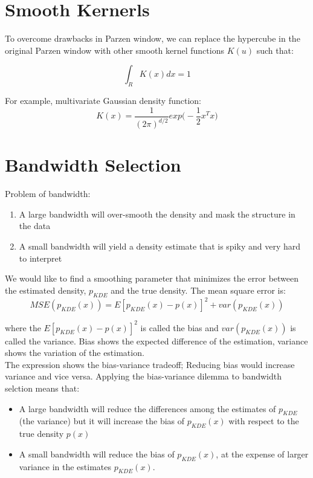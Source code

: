 \begin{multicols}{2}
\section{Smooth Kernerls}

\noindent To overcome drawbacks in Parzen window, we can replace the hypercube in the original Parzen window with other smooth kernel functions $K(u)$ such that:

$$\int_R K(x) dx = 1$$

\noindent For example, multivariate Gaussian density function:
$$K(x)=\frac{1}{(2 \pi)^{d/2}} exp \Big( - \frac{1}{2} x^T x\Big)$$

\section{Bandwidth Selection}

\noindent Problem of bandwidth:
\begin{enumerate}
    \item A large bandwidth will over-smooth the density and mask the structure in the data
    \item A small bandwidth will yield a density estimate that is spiky and very hard to interpret
\end{enumerate}

\noindent We would like to find a smoothing parameter that minimizes the error between the estimated density, $p_{KDE}$ and the true density. The mean square error is:
$$MSE(p_{KDE}(x)) = E[p_{KDE}(x) - p(x)]^2 + var(p_{KDE}(x))$$

\noindent where the $E[p_{KDE}(x) - p(x)]^2$ is called the bias and $var(p_{KDE}(x))$ is called the variance. Bias shows the expected difference of the estimation, variance shows the variation of the estimation. \\

\noindent The expression shows the bias-variance tradeoff; Reducing bias would increase variance and vice versa. Applying the bias-variance dilemma to bandwidth selction means that:
\begin{itemize}
    \item A large bandwidth will reduce the differences among the estimates of $p_{KDE}$ (the variance) but it will increase the bias of $p_{KDE}(x)$ with respect to the true density $p(x)$
    \item A small bandwidth will reduce the bias of $p_{KDE}(x)$, at the expense of larger variance in the estimates $p_{KDE}(x)$.
\end{itemize}


\end{multicols}

